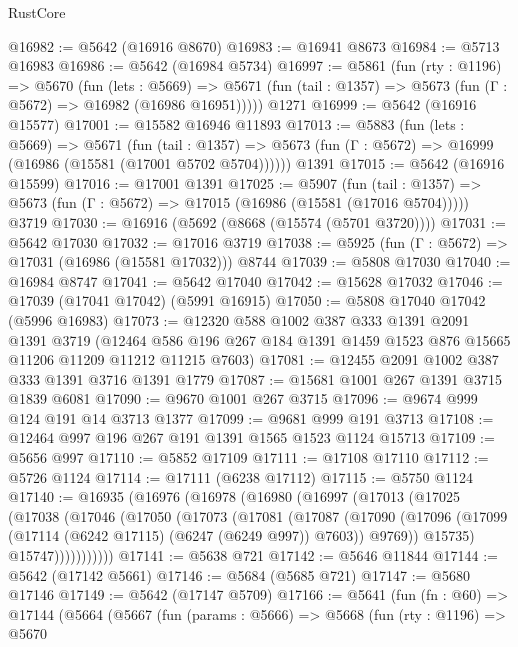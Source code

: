\begin{lexlean}{RustCore}
\begin{coremodule}
@16982 := @5642 (@16916 @8670)
@16983 := @16941 @8673
@16984 := @5713 @16983
@16986 := @5642 (@16984 @5734)
@16997 := @5861
    (fun (rty : @1196) =>
    @5670
      (fun (lets : @5669) =>
      @5671 (fun (tail : @1357) => @5673 (fun (Γ : @5672) => @16982 (@16986 @16951)))))
    @1271
@16999 := @5642 (@16916 @15577)
@17001 := @15582 @16946 @11893
@17013 := @5883
    (fun (lets : @5669) =>
    @5671
      (fun (tail : @1357) =>
      @5673 (fun (Γ : @5672) => @16999 (@16986 (@15581 (@17001 @5702 @5704))))))
    @1391
@17015 := @5642 (@16916 @15599)
@17016 := @17001 @1391
@17025 := @5907
    (fun (tail : @1357) => @5673 (fun (Γ : @5672) => @17015 (@16986 (@15581 (@17016 @5704)))))
    @3719
@17030 := @16916 (@5692 (@8668 (@15574 (@5701 @3720))))
@17031 := @5642 @17030
@17032 := @17016 @3719
@17038 := @5925 (fun (Γ : @5672) => @17031 (@16986 (@15581 @17032))) @8744
@17039 := @5808 @17030
@17040 := @16984 @8747
@17041 := @5642 @17040
@17042 := @15628 @17032
@17046 := @17039 (@17041 @17042) (@5991 @16915)
@17050 := @5808 @17040 @17042 (@5996 @16983)
@17073 := @12320
    @588
    @1002
    @387
    @333
    @1391
    @2091
    @1391
    @3719
    (@12464 @586 @196 @267 @184 @1391 @1459 @1523 @876 @15665 @11206 @11209 @11212 @11215 @7603)
@17081 := @12455 @2091 @1002 @387 @333 @1391 @3716 @1391 @1779
@17087 := @15681 @1001 @267 @1391 @3715 @1839 @6081
@17090 := @9670 @1001 @267 @3715
@17096 := @9674 @999 @124 @191 @14 @3713 @1377
@17099 := @9681 @999 @191 @3713
@17108 := @12464 @997 @196 @267 @191 @1391 @1565 @1523 @1124 @15713
@17109 := @5656 @997
@17110 := @5852 @17109
@17111 := @17108 @17110
@17112 := @5726 @1124
@17114 := @17111 (@6238 @17112)
@17115 := @5750 @1124
@17140 := @16935
    (@16976
      (@16978
        (@16980
          (@16997
            (@17013
              (@17025
                (@17038
                  (@17046
                    (@17050
                      (@17073
                        (@17081
                          (@17087
                            (@17090
                              (@17096
                                (@17099 (@17114 (@6242 @17115) (@6247 (@6249 @997)) @7603))
                                @9769))
                            @15735)
                          @15747)))))))))))
@17141 := @5638 @721
@17142 := @5646 @11844
@17144 := @5642 (@17142 @5661)
@17146 := @5684 (@5685 @721)
@17147 := @5680 @17146
@17149 := @5642 (@17147 @5709)
@17166 := @5641
    (fun (fn : @60) =>
    @17144
      (@5664
        (@5667
          (fun (params : @5666) =>
          @5668
            (fun (rty : @1196) =>
            @5670

\end{coremodule}
\end{lexlean}
